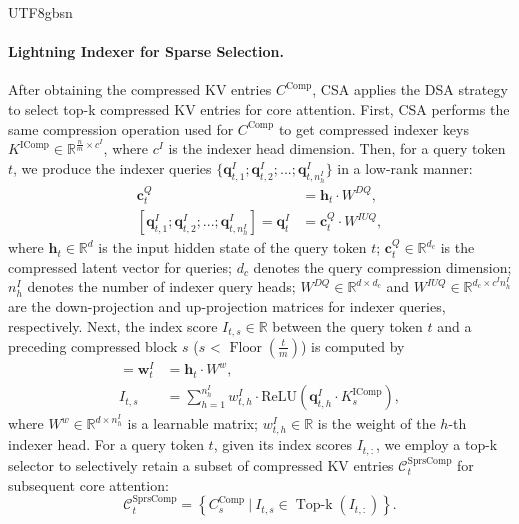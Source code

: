 \documentclass[11pt, a4paper, logo, copyright, nonumbering]{deepseek}
\newcommand{\csa}{CSA}
\newcommand{\dsa}{DSA}
\begin{document}
\begin{CJK*}{UTF8}{gbsn}
\paragraph{Lightning Indexer for Sparse Selection.}
After obtaining the compressed KV entries $C^{\text{Comp}}$, \csa{} applies the \dsa{} strategy to select top-k compressed KV entries for core attention. 
First, \csa{} performs the same compression operation used for $C^{\text{Comp}}$ to get compressed indexer keys $K^{\text{IComp}} \in \mathbb{R}^{\frac{n}{m} \times c^I}$, where $c^I$ is the indexer head dimension. 
Then, for a query token $t$, we produce the indexer queries $\{\mathbf{q}_{t, 1}^{I};\mathbf{q}_{t, 2}^{I};...;\mathbf{q}_{t, n_{h}^{I}}^{I}\}$ in a low-rank manner:
\begin{align}
    \mathbf{c}_{t}^{Q} &= \mathbf{h}_{t} \cdot W^{DQ}, \\
    [\mathbf{q}_{t, 1}^{I};\mathbf{q}_{t, 2}^{I};...;\mathbf{q}_{t, n_{h}^{I}}^{I}] = \mathbf{q}_{t}^{I} &= \mathbf{c}_{t}^{Q} \cdot W^{IUQ},
\end{align}
where $\mathbf{h}_{t} \in \mathbb{R}^{d}$ is the input hidden state of the query token $t$; $\mathbf{c}_{t}^{Q} \in \mathbb{R}^{d_c}$ is the compressed latent vector for queries; $d_c$ denotes the query compression dimension; $n_{h}^{I}$ denotes the number of indexer query heads; $W^{DQ} \in \mathbb{R}^{d \times d_c}$ and $W^{IUQ} \in \mathbb{R}^{d_c \times c^I n_h^I}$ are the down-projection and up-projection matrices for indexer queries, respectively.
Next, the index score $I_{t, s} \in \mathbb{R}$ between the query token $t$ and a preceding compressed block $s$ ($s$ < $\operatorname{Floor}(\frac{t}{m})$) is computed by
\begin{align}
    [w_{t, 1}^I; w_{t, 2}^I; ...; w_{t, n_{h}^{I}}^I] = \mathbf{w}_t^I & = \mathbf{h}_{t} \cdot W^w, \\
    I_{t, s} & = \sum_{h=1}^{n_h^I} w_{t, h}^I \cdot \text{ReLU}\left(\mathbf{q}^{I}_{t, h} \cdot K^{\text{IComp}}_{s}\right),
\end{align}
where $W^w \in \mathbb{R}^{d \times n_{h}^{I}}$ is a learnable matrix; $w_{t, h}^I \in \mathbb{R}$ is the weight of the $h$-th indexer head.
For a query token $t$, given its index scores $I_{t, :}$, we employ a top-k selector to selectively retain a subset of compressed KV entries $\mathcal{C}^{\text{SprsComp}}_t$ for subsequent core attention:
\begin{equation}
    \mathcal{C}^{\text{SprsComp}}_t = \left\{ C^{\text{Comp}}_{s} ~\Big|~ I_{t, s} \in \operatorname{Top-k} (I_{t, :}) \right\}.
\end{equation}


\end{CJK*}
\end{document}

